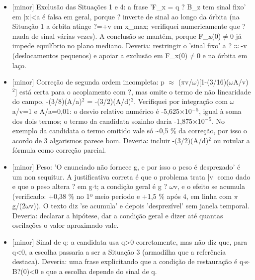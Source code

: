 \documentclass{article}%
\begin{document}
\begin{itemize}%
\item%
{[}minor{]} Exclusão das Situações 1 e 4: a frase 'F\_x = q ? B\_z tem sinal fixo' em |x|<a é falsa em geral, porque ? inverte de sinal ao longo da órbita (na Situação 1 a órbita atinge ?=+v em x\_max; verifiquei numericamente que ? muda de sinal várias vezes). A conclusão se mantém, porque F\_x(0)$\neq$0 já impede equilíbrio no plano mediano. Deveria: restringir o 'sinal fixo' a ?$\approx$-v (deslocamentos pequenos) e apoiar a exclusão em F\_x(0)$\neq$0 e na órbita em laço.%
\item%
{[}minor{]} Correção de segunda ordem incompleta: p $\approx$ ($\pi$v/$\omega$){[}1-(3/16)($\omega$A/v)$^2${]} está certa para o acoplamento com ?, mas omite o termo de não linearidade do campo, -(3/8)(A/a)$^2$ = -(3/2)(A/d)$^2$. Verifiquei por integração com $\omega$a/v=1 e A/a=0,01: o desvio relativo numérico é -5,625$\times$10$^{-}$$^{5}$, igual à soma dos dois termos; o termo da candidata sozinho daria -1,875$\times$10$^{-}$$^{5}$. No exemplo da candidata o termo omitido vale só \textasciitilde{}0,5 \% da correção, por isso o acordo de 3 algarismos parece bom. Deveria: incluir -(3/2)(A/d)$^2$ ou rotular a fórmula como correção parcial.%
\item%
{[}minor{]} Peso: 'O enunciado não fornece g, e por isso o peso é desprezado' é um non sequitur. A justificativa correta é que o problema trata |v| como dado e que o peso altera ? em g$\cdot$t; a condição geral é g ? $\omega$v, e o efeito se acumula (verificado: +0,38 \% no 1º meio período e +1,5 \% após 4, em linha com $\pi$g/(2$\omega$v)). O texto diz 'se acumula' e depois 'desprezível' sem janela temporal. Deveria: declarar a hipótese, dar a condição geral e dizer até quantas oscilações o valor aproximado vale.%
\item%
{[}minor{]} Sinal de q: a candidata usa q>0 corretamente, mas não diz que, para q<0, a escolha passaria a ser a Situação 3 (armadilha que a referência destaca). Deveria: uma frase explicitando que a condição de restauração é q$\cdot$s$\cdot$B?(0)<0 e que a escolha depende do sinal de q.%
\end{itemize}%
\end{document}
